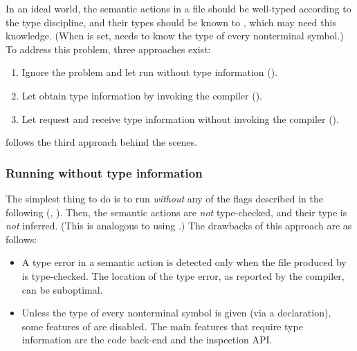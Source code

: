 \documentclass[onecolumn,11pt,nocopyrightspace,preprint]{sigplanconf}
\begin{document}
In an ideal world, the semantic actions in a \mly file should be well-typed
according to the \ocaml type discipline, and their types should be known to
\menhir, which may need this knowledge. (When \oinspection is set, \menhir
needs to know the \ocaml type of every nonterminal symbol.)
%
To address this problem, three approaches exist:
\begin{enumerate}
\item Ignore the problem and let \menhir run without \ocaml type information
      ().
\item Let \menhir obtain \ocaml type information
      by invoking the \ocaml compiler
      ().
\item Let \menhir request and receive \ocaml type information
      without invoking the \ocaml compiler
      ().
\end{enumerate}
%
\dune follows the third approach behind the scenes.

\subsubsection{Running without \ocaml type information}
\label{sec:build:infer:none}

The simplest thing to do is to run \menhir \emph{without} any of the flags
described in the following (,
).
%
Then, the semantic actions are \emph{not} type-checked,
and their \ocaml type is \emph{not} inferred.
%
(This is analogous to using \ocamlyacc.)
%
The drawbacks of this approach are as follows:
\begin{itemize}
\item A type error in a semantic action is detected only when the \ml
      file produced by \menhir is type-checked. The location of the
      type error, as reported by the \ocaml compiler, can be
      suboptimal.
\item Unless the type of every nonterminal symbol is given
      (via a \dtype declaration),
      some features of \menhir are disabled.
      The main features that require type information are
      the code back-end
      and
      the inspection API.
\end{itemize}
\end{document}
